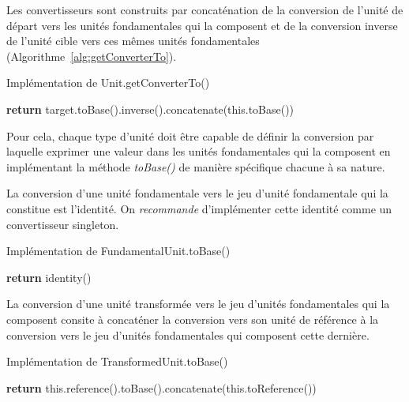 \documentclass[a4paper,draft,twoside,10pt]{article}
\begin{document}
Les convertisseurs sont construits par concaténation de la conversion de l'unité de départ vers les unités fondamentales
qui la composent et de la conversion inverse de l'unité cible vers ces mêmes unités fondamentales
(Algorithme~\ref{alg:getConverterTo​}).

\begin{algorithm}[!h]
\caption{Implémentation de Unit.getConverterTo​()}\label{alg:getConverterTo​}
\begin{algorithmic}
\State \textbf{return} target.toBase().inverse().concatenate(this.toBase())
\EndProcedure
\end{algorithmic}
\end{algorithm}

Pour cela, chaque type d'unité doit être capable de définir la conversion par laquelle exprimer une valeur dans les
unités fondamentales qui la composent en implémentant la méthode \emph{toBase()} de manière spécifique chacune à sa
nature.

La conversion d'une unité fondamentale vers le jeu d'unité fondamentale qui la constitue est l'identité. On
\emph{recommande} d'implémenter cette identité comme un convertisseur singleton.

\begin{algorithm}[!h]
\caption{Implémentation de FundamentalUnit.toBase()}\label{alg:fundamentalUnit:toBase}
\begin{algorithmic}
\State \textbf{return} identity()
\EndProcedure
\end{algorithmic}
\end{algorithm}

La conversion d'une unité transformée vers le jeu d'unités fondamentales qui la composent consite à concaténer la
conversion vers son unité de référence à la conversion vers le jeu d'unités fondamentales qui composent cette dernière.

\begin{algorithm}[!h]
\caption{Implémentation de TransformedUnit.toBase()}\label{alg:transformedUnit:toBase}
\begin{algorithmic}
\State \textbf{return} this.reference().toBase().concatenate(this.toReference())
\EndProcedure
\end{algorithmic}
\end{algorithm}
\end{document}
